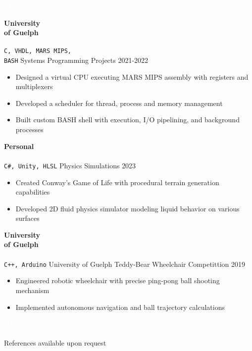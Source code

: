 \documentclass[9pt]{src/developercv} %
\begin{document}
	\colorbox{sky600}{\textcolor{white}{\LARGE\MakeUppercase{\textbf{Significant Projects}}}}\\%
	\begin{entrylist}
		\entry
			{\textbf{University\\of Guelph}\\\\\small{\texttt{C, VHDL, MARS MIPS,\\BASH}}}
			{Systems Programming Projects}
			{2021-2022}
			{
				\vspace{-1.0\baselineskip}
				\begin{itemize}
					\item Designed a virtual CPU executing MARS MIPS assembly with registers and multiplexers
					\item Developed a scheduler for thread, process and memory management 
					\item Built custom BASH shell with execution, I/O pipelining, and background processes
				\end{itemize}
			}
		\entry
			{\textbf{Personal}\\\\\small{\texttt{C\#, Unity, HLSL}}}
			{Physics Simulations}
			{2023}
			{
				\vspace{-1.0\baselineskip}
				\begin{itemize}
					\item Created Conway's Game of Life with procedural terrain generation capabilities
					\item Developed 2D fluid physics simulator modeling liquid behavior on various surfaces
				\end{itemize}
			}
		\entry
			{\textbf{University\\of Guelph}\\\\\small{\texttt{C++, Arduino}}}
			{University of Guelph Teddy-Bear Wheelchair Competittion}
			{2019}
			{
				\vspace{-1.0\baselineskip}
				\begin{itemize}
					\item Engineered robotic wheelchair with precise ping-pong ball shooting mechanism
					\item Implemented autonomous navigation and ball trajectory calculations
				\end{itemize}
			}
	\end{entrylist}

	\colorbox{sky500}{\textcolor{white}{\LARGE\MakeUppercase{\textbf{References}}}}\\\\
	{\large References available upon request}
\end{document}
